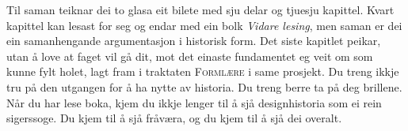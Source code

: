 Til saman teiknar dei to glasa eit bilete med sju delar og tjuesju kapittel. Kvart kapittel kan lesast for seg og endar med ein bolk \emph{Vidare lesing}, men saman er dei ein samanhengande argumentasjon i historisk form. Det siste kapitlet peikar, utan å love at faget vil gå dit, mot det einaste fundamentet eg veit om som kunne fylt holet, lagt fram i traktaten \textsc{Formlære} i same prosjekt. Du treng ikkje tru på den utgangen for å ha nytte av historia. Du treng berre ta på deg brillene. Når du har lese boka, kjem du ikkje lenger til å sjå designhistoria som ei rein sigerssoge. Du kjem til å sjå fråværa, og du kjem til å sjå dei overalt.

